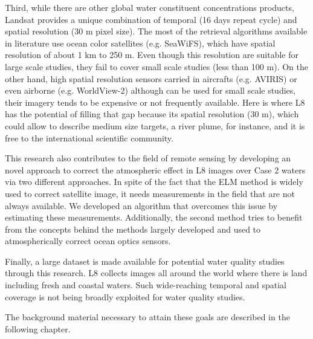 Third, while there are other global water constituent concentrations products, Landsat provides a unique combination of temporal (16 days repeat cycle) and spatial resolution (30 m pixel size). The most of the retrieval algorithms available in literature use ocean color satellites (e.g. SeaWiFS), which have spatial resolution of about 1 km to 250 m. Even though this resolution are suitable for large scale studies, they fail to cover small scale studies (less than 100 m). On the other hand, high spatial resolution sensors carried in aircrafts (e.g. AVIRIS) or even airborne (e.g. WorldView-2) although can be used for small scale studies, their imagery tends to be expensive or not frequently available. Here is where L8 has the potential of filling that gap because its spatial resolution (30 m), which could allow to describe medium size targets, a river plume, for instance, and it is free to the international scientific community.

This research also contributes to the field of remote sensing by developing an novel approach to correct the atmospheric effect in L8 images over Case 2 waters via two different approaches. In spite of the fact that the ELM method is widely used to correct satellite image, it needs measurements in the field that are not always available. We developed an algorithm that overcomes this issue by estimating these measurements. Additionally, the { \color{red} second method} tries to benefit from the concepts behind the methods largely developed and used to atmospherically correct ocean optics sensors.

Finally, a large dataset is made available for potential water quality studies through this research. L8 collects images all around the world where there is land including fresh and coastal waters. Such wide-reaching temporal and spatial coverage is not being broadly exploited for water quality studies.

The background material necessary to attain these goals are described in the following chapter.

